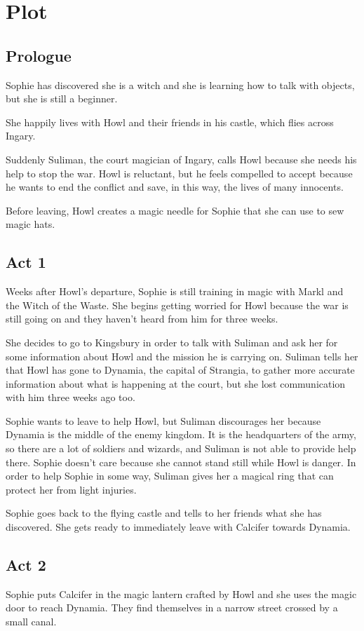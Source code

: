 \section{Plot}

\subsection*{Prologue}
Sophie has discovered she is a witch and she is learning how to talk with objects, but she is still a beginner.

She happily lives with Howl and their friends in his castle, which flies across Ingary.

Suddenly Suliman, the court magician of Ingary, calls Howl because she needs his help to stop the war. Howl is reluctant, but he feels compelled to accept because he wants to end the conflict and save, in this way, the lives of many innocents.

Before leaving, Howl creates a magic needle for Sophie that she can use to sew magic hats.

\subsection*{Act 1}
Weeks after Howl's departure, Sophie is still training in magic with Markl and the Witch of the Waste. She begins getting worried for Howl because the war is still going on and they haven't heard from him for three weeks.

She decides to go to Kingsbury in order to talk with Suliman and ask her for some information about Howl and the mission he is carrying on. Suliman tells her that Howl has gone to Dynamia, the capital of Strangia, to gather more accurate information about what is happening at the court, but she lost communication with him three weeks ago too.

Sophie wants to leave to help Howl, but Suliman discourages her because Dynamia is the middle of the enemy kingdom. It is the headquarters of the army, so there are a lot of soldiers and wizards, and Suliman is not able to provide help there. Sophie doesn't care because she cannot stand still while Howl is danger. In order to help Sophie in some way, Suliman gives her a magical ring that can protect her from light injuries.

Sophie goes back to the flying castle and tells to her friends what she has discovered. She gets ready to immediately leave with Calcifer towards Dynamia.

\subsection*{Act 2}
Sophie puts Calcifer in the magic lantern crafted by Howl and she uses the magic door to reach Dynamia. They find themselves in a narrow street crossed by a small canal.

